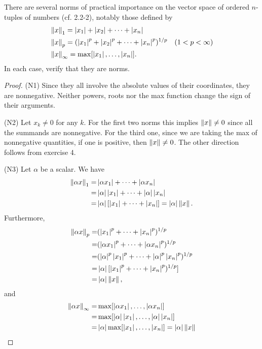 \begin{exercise}{8}
There are several norms of practical importance on the vector space of ordered $n$-tuples of numbers (cf. 2.2-2), notably those defined by
\begin{align*}
    &\left\lVert x\right\rVert_1 = \left\lvert x_1\right\rvert+\left\lvert x_2\right\rvert+\dots+\left\lvert x_n\right\rvert\\
    &\left\lVert x\right\rVert_p = (\left\lvert x_1\right\rvert^p+\left\lvert x_2\right\rvert^p+\dots+\left\lvert x_n\right\rvert^p)^{1/p}\quad (1<p<\infty)\\
    &\left\lVert x\right\rVert_\infty = \max[\left\lvert x_1\right\rvert,\dots,\left\lvert x_n\right\rvert].
\end{align*}
In each case, verify that they are norms.
\end{exercise}
\begin{proof}
(N1) Since they all involve the absolute values of their coordinates, they are nonnegative. Neither powers, roots nor the max function change the sign of their arguments.

(N2) Let $x_k\neq 0$ for any $k$. For the first two norms this implies $\left\lVert x\right\rVert\neq 0$ since all the summands are nonnegative. For the third one, since we are taking the max of nonnegative quantities, if one is positive, then $\left\lVert x\right\rVert\neq 0$. The other direction follows from exercise 4.

(N3) Let $\alpha$ be a scalar. We have
\begin{align*}
    \left\lVert \alpha x\right\rVert_1 
    =& \left\lvert \alpha x_1\right\rvert+\dots+\left\lvert \alpha x_n\right\rvert\\ 
    =& \left\lvert \alpha\right\rvert\left\lvert  x_1\right\rvert+\dots+\left\lvert \alpha\right\rvert\left\lvert x_n\right\rvert\\
    =& \left\lvert \alpha\right\rvert[\left\lvert  x_1\right\rvert+\dots+\left\lvert x_n\right\rvert] 
    = \left\lvert \alpha\right\rvert\left\lVert x\right\rVert.
\end{align*}
Furthermore,
\begin{align*}
    \left\lVert \alpha x\right\rVert_p 
    =& (\left\lvert x_1\right\rvert^p+\dots+\left\lvert x_n\right\rvert^p)^{1/p}\\
    =& (\left\lvert \alpha x_1\right\rvert^p+\dots+\left\lvert \alpha x_n\right\rvert^p)^{1/p}\\
    =&(\left\lvert \alpha\right\rvert^p\left\lvert x_1\right\rvert^p+\dots+\left\lvert \alpha\right\rvert^p\left\lvert x_n\right\rvert^p)^{1/p}\\
    =& \left\lvert \alpha\right\rvert[\left\lvert x_1\right\rvert^p+\dots+\left\lvert x_n\right\rvert^p)^{1/p}]\\
    =& \left\lvert \alpha\right\rvert\left\lVert x\right\rVert,
\end{align*}
and
\begin{align*}
    \left\lVert \alpha x\right\rVert_\infty 
    =& \max[\left\lvert \alpha x_1\right\rvert,\dots,\left\lvert \alpha x_n\right\rvert]\\
    =& \max[\left\lvert \alpha\right\rvert\left\lvert x_1\right\rvert,\dots,\left\lvert \alpha\right\rvert\left\lvert x_n\right\rvert]\\
    =& \left\lvert \alpha\right\rvert\max[\left\lvert x_1\right\rvert,\dots,\left\lvert x_n\right\rvert] = \left\lvert \alpha\right\rvert\left\lVert x\right\rVert
\end{align*}


\end{proof}
